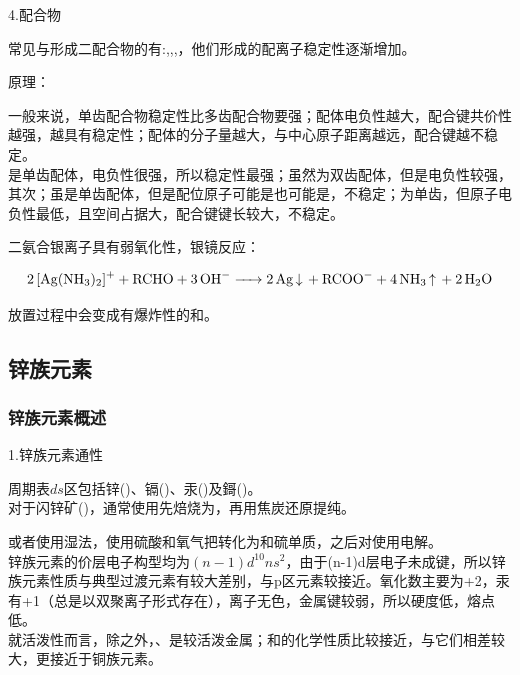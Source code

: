 \documentclass[a4paper,UTF8]{article}
\begin{document}
4.配合物

常见与形成二配合物的有:,,,，他们形成的配离子稳定性逐渐增加。

\begin{tcolorbox}

原理：

一般来说，单齿配合物稳定性比多齿配合物要强；配体电负性越大，配合键共价性越强，越具有稳定性；配体的分子量越大，与中心原子距离越远，配合键越不稳定。\\

是单齿配体，电负性很强，所以稳定性最强；虽然为双齿配体，但是电负性较强，其次；虽是单齿配体，但是配位原子可能是也可能是，不稳定；为单齿，但原子电负性最低，且空间占据大，配合键键长较大，不稳定。

\end{tcolorbox}

二氨合银离子具有弱氧化性，银镜反应：

$$ \ce{2[Ag(NH3)2]+ + RCHO + 3OH- -> 2Ag\ce{v} + RCOO- + 4NH3\ce{^} + 2H2O} $$

放置过程中会变成有爆炸性的和。

\subsection{锌族元素}

\subsubsection{锌族元素概述}

1.锌族元素通性

周期表$ds$区包括锌()、镉()、汞()及鎶()。\\

对于闪锌矿()，通常使用先焙烧为，再用焦炭还原提纯。

或者使用湿法，使用硫酸和氧气把转化为和硫单质，之后对使用电解。\\

锌族元素的价层电子构型均为$(n-1)d^{10}ns^{2}$，由于(n-1)d层电子未成键，所以锌族元素性质与典型过渡元素有较大差别，与p区元素较接近。氧化数主要为+2，汞有+1（总是以双聚离子形式存在），离子无色，金属键较弱，所以硬度低，熔点低。\\

就活泼性而言，除之外，、是较活泼金属；和的化学性质比较接近，与它们相差较大，更接近于铜族元素。\\
\end{document}
